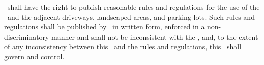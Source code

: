 \lessor\ shall have the right to publish reasonable rules and regulations for the use of the \property\ and the adjacent driveways, landscaped areas, and parking lots. Such rules and regulations shall be published by \lessor\ in written form, enforced in a non-discriminatory manner and shall not be inconsistent with the \termoflease, and, to the extent of any inconsistency between this \amendmentTitle\ and the rules and regulations, this \amendmentTitle\ shall govern and control.
